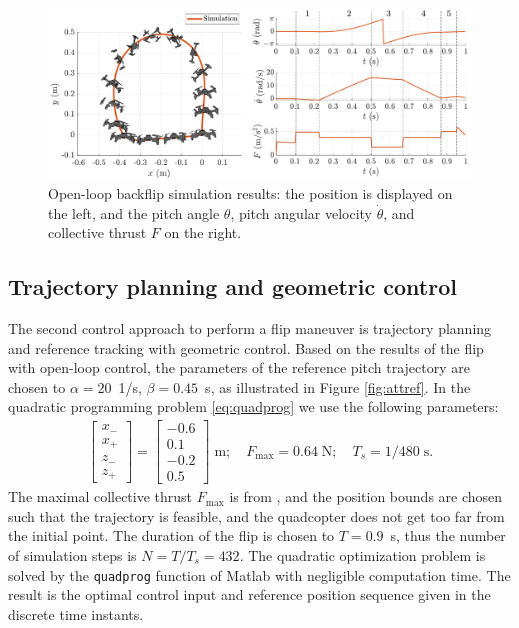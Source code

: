 \begin{figure}[!h]
\centering
\includegraphics[width=\linewidth]{Fig/opensimu.pdf}
\caption{Open-loop backflip simulation results: the position is displayed on the left, and the pitch angle $\theta$, pitch angular velocity $\dot{\theta}$, and collective thrust $F$ on the right.}\label{fig:opensimu}
\end{figure}




\pagebreak
\subsection{Trajectory planning and geometric control}

The second control approach to perform a flip maneuver is trajectory planning and reference tracking with geometric control. Based on the results of the flip with open-loop control, the parameters of the reference pitch trajectory are chosen to $\alpha=20$~1/s, $\beta=0.45$~s, as illustrated in Figure \ref{fig:attref}. In the quadratic programming problem \eqref{eq:quadprog} we use the following parameters:
\begin{align*}
    \begin{bmatrix} x_- \\ x_+ \\ z_- \\ z_+ \end{bmatrix} =  \begin{bmatrix} -0.6 \\ 0.1 \\ -0.2 \\ 0.5 \end{bmatrix}\;\mathrm{m};\quad F_\mathrm{max} = 0.64\;\mathrm{N}; \quad T_s = 1/480\;\mathrm{s}.
\end{align*}
The maximal collective thrust $F_\mathrm{max}$ is from \cite{Forster}, and the position bounds are chosen such that the trajectory is feasible, and the quadcopter does not get too far from the initial point. The duration of the flip is chosen to $T=0.9$~s, thus the number of simulation steps is $N=T/T_s=432$. The quadratic optimization problem is solved by the \verb+quadprog+ function of Matlab with negligible computation time. The result is the optimal control input and reference position sequence given in the discrete time instants.


